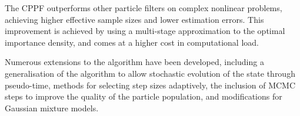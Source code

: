\documentclass[conference]{IEEEtran}
\begin{document}
The CPPF outperforms other particle filters on complex nonlinear problems, achieving higher effective sample sizes and lower estimation errors. This improvement is achieved by using a multi-stage approximation to the optimal importance density, and comes at a higher cost in computational load.

Numerous extensions to the algorithm have been developed, including a generalisation of the algorithm to allow stochastic evolution of the state through pseudo-time, methods for selecting step sizes adaptively, the inclusion of MCMC steps to improve the quality of the particle population, and modifications for Gaussian mixture models.




%
%



%
%
\end{document}

